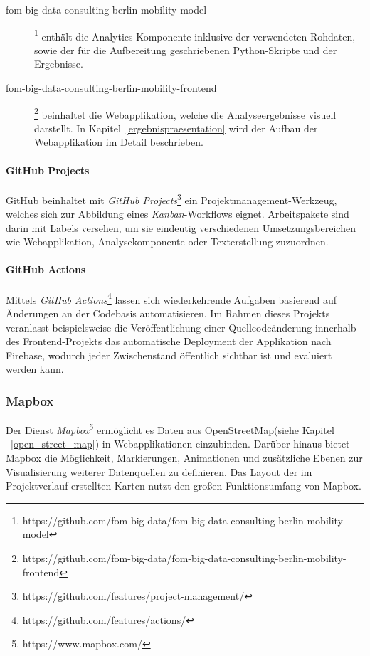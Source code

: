 \begin{description}
    \item[fom-big-data-consulting-berlin-mobility-model]\footnote{https://github.com/fom-big-data/fom-big-data-consulting-berlin-mobility-model} enthält die Analytics-Komponente inklusive der verwendeten Rohdaten, sowie der für die Aufbereitung geschriebenen Python-Skripte und der Ergebnisse.
    \item[fom-big-data-consulting-berlin-mobility-frontend]\footnote{https://github.com/fom-big-data/fom-big-data-consulting-berlin-mobility-frontend} beinhaltet die Webapplikation, welche die Analyseergebnisse visuell darstellt. In Kapitel~\ref{ergebnispraesentation} wird der Aufbau der Webapplikation im Detail beschrieben.
\end{description}

\paragraph*{GitHub Projects}
\label{github_projects}

GitHub beinhaltet mit \emph{GitHub Projects}\footnote{https://github.com/features/project-management/} ein Projektmanagement-Werkzeug, welches sich zur Abbildung eines \emph{Kanban}-Workflows eignet. Arbeitspakete sind darin mit Labels versehen, um sie eindeutig verschiedenen Umsetzungsbereichen wie Webapplikation, Analysekomponente oder Texterstellung zuzuordnen.

\paragraph*{GitHub Actions}
\label{github_actions}

Mittels \emph{GitHub Actions}\footnote{https://github.com/features/actions/} lassen sich wiederkehrende Aufgaben basierend auf Änderungen an der Codebasis automatisieren. Im Rahmen dieses Projekts veranlasst beispielsweise die Veröffentlichung einer Quellcodeänderung innerhalb des Frontend-Projekts das automatische Deployment der Applikation nach Firebase, wodurch jeder Zwischenstand öffentlich sichtbar ist und evaluiert werden kann.

\subsubsection{Mapbox}
\label{mapbox}

Der Dienst \emph{Mapbox}\footnote{https://www.mapbox.com/} ermöglicht es Daten aus OpenStreetMap(siehe Kapitel ~\ref{open_street_map}) in Webapplikationen einzubinden. Darüber hinaus bietet Mapbox die Möglichkeit, Markierungen, Animationen und zusätzliche Ebenen zur Visualisierung weiterer Datenquellen zu definieren. Das Layout der im Projektverlauf erstellten Karten nutzt den großen Funktionsumfang von Mapbox.

